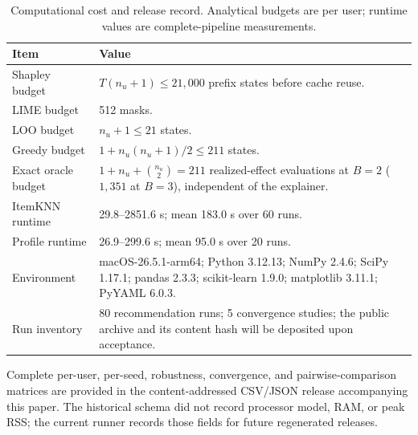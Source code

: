 \begin{table}[!htbp]
\centering\scriptsize
\caption{Computational cost and release record. Analytical budgets are per user; runtime values are complete-pipeline measurements.}
\label{tab:app-computation}
\begin{tabular}{@{}p{}p{}@{}}
\toprule
Item & Value \\
\midrule
Shapley budget & $T(n_u+1)\le21{,}000$ prefix states before cache reuse. \\
LIME budget & 512 masks. \\
LOO budget & $n_u+1\le21$ states. \\
Greedy budget & $1+n_u(n_u+1)/2\le211$ states. \\
Exact oracle budget & $1+n_u+\binom{n_u}{2}=211$ realized-effect evaluations at $B=2$ ($1{,}351$ at $B=3$), independent of the explainer. \\
ItemKNN runtime & 29.8--2851.6 s; mean 183.0 s over 60 runs. \\
Profile runtime & 26.9--299.6 s; mean 95.0 s over 20 runs. \\
Environment & macOS-26.5.1-arm64; Python 3.12.13; NumPy 2.4.6; SciPy 1.17.1; pandas 2.3.3; scikit-learn 1.9.0; matplotlib 3.11.1; PyYAML 6.0.3. \\
Run inventory & 80 recommendation runs; 5 convergence studies; the public archive and its content hash will be deposited upon acceptance. \\
\bottomrule
\end{tabular}
\end{table}

\noindent Complete per-user, per-seed, robustness, convergence, and pairwise-comparison matrices are provided in the content-addressed CSV/JSON release accompanying this paper. The historical schema did not record processor model, RAM, or peak RSS; the current runner records those fields for future regenerated releases.

